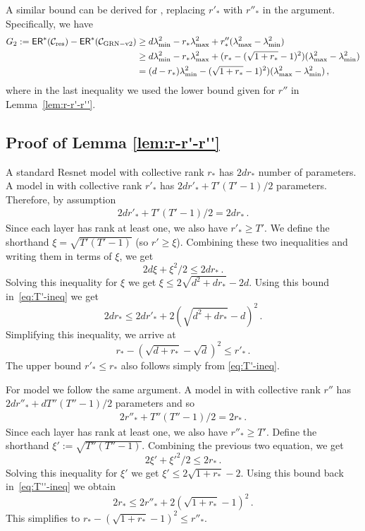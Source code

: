 A similar bound can be derived for \GenB{}, replacing $r'_*$ with $r''_*$ in the argument. Specifically, we have
\begin{align*}
G_2: ={\sf ER}^*(\mathcal{C}_{\rm res}) - {\sf ER}^*(\mathcal{C}_{\rm GRN-v2{}}) 
 & \ge  d\lambda_{\min}^2 - r_* \lambda_{\max}^2 +r''_*(\lambda_{\max}^2- \lambda_{\min}^2)\\
 &\ge d\lambda_{\min}^2 - r_* \lambda_{\max}^2 + (r_* - (\sqrt{1+r_*}-1)^2)(\lambda_{\max}^2- \lambda_{\min}^2)\\
 &= (d-r_*)\lambda_{\min}^2 - (\sqrt{1+r_*}-1)^2)(\lambda_{\max}^2- \lambda_{\min}^2)\,,
\end{align*}
where in the last inequality we used the lower bound given for $r''$ in Lemma~\ref{lem:r-r'-r''}.

\subsection{Proof of Lemma \ref{lem:r-r'-r''}} A standard Resnet model with collective rank $r_*$ has $2dr_*$ number of parameters. A model in \GenA{} with collective rank $r'_*$ has $2dr'_* + T'(T'-1)/2$ parameters. Therefore, by assumption
\begin{align}\label{eq:T'-ineq}
2dr'_* + T'(T'-1)/2 = 2dr_*\,.
\end{align}
Since each layer has rank at least one, we also have $r'_*\ge T'$. We define the shorthand $\xi= \sqrt{T'(T'-1)}$ (so $r'\ge \xi$). Combining these two inequalities and writing them in terms of $\xi$, we get
\[
2d \xi + \xi^2/2\le 2dr_*\,.
\]
Solving this inequality for $\xi$ we get $\xi\le 2\sqrt{d^2+dr_*}-2d$. Using this bound in~\eqref{eq:T'-ineq} we get
\[
2dr_* \le 2dr'_* + 2(\sqrt{d^2+dr_*}-d)^2\,.  
\]
Simplifying this inequality, we arrive at
\[
r_* - (\sqrt{d+r_*}-\sqrt{d})^2 \le r'_*\,.
\]
The upper bound $r'_*\le r_*$ also follows simply from \eqref{eq:T'-ineq}.

For \GenB{} model we follow the same argument. A model in \GenB{} with collective rank $r''$ has
$2dr''_*+ d T''(T''-1)/2$ parameters and so
\begin{align}\label{eq:T''-ineq}
2r''_*+  T''(T''-1)/2 = 2r_*\,.
\end{align}
Since each layer has rank at least one, we also have $r''_*\ge T'$. Define the shorthand $\xi':= \sqrt{T''(T''-1)}$. Combining the previous two equation, we get
\[
2\xi' +  \xi'^2/2\le 2r_*\,.
\]
Solving this inequality for $\xi'$ we get $\xi'\le 2\sqrt{1+r_*}-2$. Using this bound back in~\eqref{eq:T''-ineq} we obtain
\[
2r_*\le 2r''_*+  2(\sqrt{1+r_*}-1)^2\,.
\]
This simplifies to $r_* - (\sqrt{1+r_*}-1)^2\le r''_*$.

